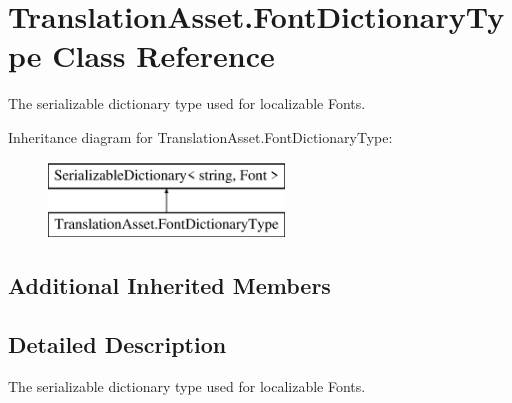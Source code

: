 \hypertarget{class_translation_asset_1_1_font_dictionary_type}{}\section{Translation\+Asset.\+Font\+Dictionary\+Type Class Reference}
\label{class_translation_asset_1_1_font_dictionary_type}


The serializable dictionary type used for localizable Fonts.  


Inheritance diagram for Translation\+Asset.\+Font\+Dictionary\+Type\+:\begin{figure}[H]
\begin{center}
\leavevmode
\includegraphics[height=2.000000cm]{class_translation_asset_1_1_font_dictionary_type}
\end{center}
\end{figure}
\subsection*{Additional Inherited Members}


\subsection{Detailed Description}
The serializable dictionary type used for localizable Fonts. 

